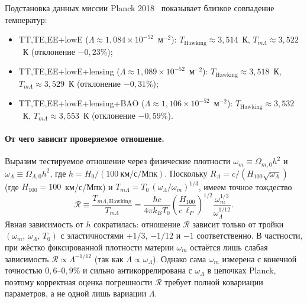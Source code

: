 \documentclass[12pt,a4paper]{article}
\begin{document}
Подстановка данных миссии Planck 2018~\cite{Planck2018} показывает близкое совпадение температур:
\begin{itemize}
\item TT,TE,EE+lowE ($\Lambda \approx 1{,}084 \times 10^{-52}$~м$^{-2}$): $T_{\mathrm{Hawking}} \approx 3{,}514$~К, $T_{m\Lambda} \approx 3{,}522$~К (отклонение $-0{,}23\%$);
\item TT,TE,EE+lowE+lensing ($\Lambda \approx 1{,}089 \times 10^{-52}$~м$^{-2}$): $T_{\mathrm{Hawking}} \approx 3{,}518$~К, $T_{m\Lambda} \approx 3{,}529$~К (отклонение $-0{,}31\%$);
\item TT,TE,EE+lowE+lensing+BAO ($\Lambda \approx 1{,}106 \times 10^{-52}$~м$^{-2}$): $T_{\mathrm{Hawking}} \approx 3{,}532$~К, $T_{m\Lambda} \approx 3{,}553$~К (отклонение $-0{,}59\%$).
\end{itemize}

\paragraph{От чего зависит проверяемое отношение.}
Выразим тестируемое отношение через физические плотности $\omega_m \equiv \Omega_{m,0}h^2$ и $\omega_\Lambda \equiv \Omega_{\Lambda,0}h^2$, где $h = H_0/(100~\text{км/с/Мпк})$. Поскольку $R_\Lambda = c/(H_{100}\sqrt{\omega_\Lambda})$ (где $H_{100} = 100$~км/с/Мпк) и $T_{m\Lambda} = T_0\,(\omega_\Lambda/\omega_m)^{1/3}$, имеем точное тождество
\begin{equation}
\mathcal{R} \equiv \frac{T_{m\Lambda\mathrm{, Hawking}}}{T_{m\Lambda}}
= \frac{\hbar c}{4\pi k_B T_0}\left(\frac{H_{100}}{c\,\ell_P}\right)^{1/2}\frac{\omega_m^{1/3}}{\omega_\Lambda^{1/12}}.
\label{eq:ratio_omegas}
\end{equation}
Явная зависимость от $h$ сократилась: отношение $\mathcal{R}$ зависит только от тройки $(\omega_m,\,\omega_\Lambda,\,T_0)$ с эластичностями $+1/3$, $-1/12$ и $-1$ соответственно. В частности, при жёстко фиксированной плотности материи $\omega_m$ остаётся лишь слабая зависимость $\mathcal{R}\propto\Lambda^{-1/12}$ (так как $\Lambda \propto \omega_\Lambda$). Однако сама $\omega_m$ измерена с конечной точностью $0{,}6$--$0{,}9\%$ и сильно антикоррелирована с $\omega_\Lambda$ в цепочках Planck, поэтому корректная оценка погрешности $\mathcal{R}$ требует полной ковариации параметров, а не одной лишь вариации $\Lambda$.
\end{document}
